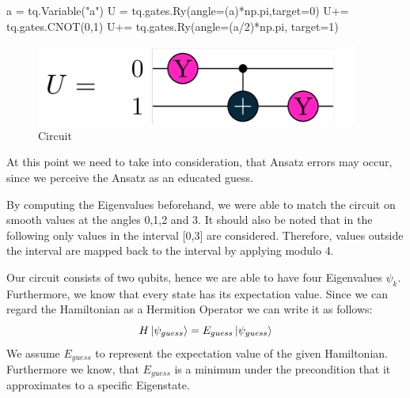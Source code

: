 \documentclass[
  letterpaper,
  DIV=11,
  numbers=noendperiod]{scrartcl}
\newenvironment{Shaded}{\begin{snugshade}}{\end{snugshade}}
\newcommand{\DecValTok}[1]{\textcolor[rgb]{0.68,0.00,0.00}{#1}}
\newcommand{\NormalTok}[1]{\textcolor[rgb]{0.00,0.23,0.31}{#1}}
\newcommand{\OperatorTok}[1]{\textcolor[rgb]{0.37,0.37,0.37}{#1}}
\newcommand{\StringTok}[1]{\textcolor[rgb]{0.13,0.47,0.30}{#1}}
\begin{document}
\begin{Shaded}
\begin{Highlighting}[]
\NormalTok{a }\OperatorTok{=}\NormalTok{ tq.Variable(}\StringTok{"a"}\NormalTok{)}
\NormalTok{U }\OperatorTok{=}\NormalTok{ tq.gates.Ry(angle}\OperatorTok{=}\NormalTok{(a)}\OperatorTok{*}\NormalTok{np.pi,target}\OperatorTok{=}\DecValTok{0}\NormalTok{)}
\NormalTok{U}\OperatorTok{+=}\NormalTok{ tq.gates.CNOT(}\DecValTok{0}\NormalTok{,}\DecValTok{1}\NormalTok{)}
\NormalTok{U}\OperatorTok{+=}\NormalTok{ tq.gates.Ry(angle}\OperatorTok{=}\NormalTok{(a}\OperatorTok{/}\DecValTok{2}\NormalTok{)}\OperatorTok{*}\NormalTok{np.pi, target}\OperatorTok{=}\DecValTok{1}\NormalTok{)}
\end{Highlighting}
\end{Shaded}

\begin{figure}[H]

{\centering \includegraphics[width=4.16667in,height=\textheight]{circuit.png}

}

\caption{Circuit}

\end{figure}%

At this point we need to take into consideration, that Ansatz errors may
occur, since we perceive the Ansatz as an educated guess.

By computing the Eigenvalues beforehand, we were able to match the
circuit on smooth values \hspace{0pt}\hspace{0pt}at the angles 0,1,2 and
3. It should also be noted that in the following only values
\hspace{0pt}\hspace{0pt}in the interval {[}0,3{]} are considered.
Therefore, values \hspace{0pt}\hspace{0pt}outside the interval are
mapped back to the interval by applying modulo 4.

Our circuit consists of two qubits, hence we are able to have four
Eigenvalues \(\psi_{k}\). Furthermore, we know that every state has its
expectation value. Since we can regard the Hamiltonian as a Hermition
Operator we can write it as follows:\\
\[H\ket{\psi_{guess}} =  E_{guess}\ket{\psi_{guess}}\] We assume
\(E_{guess}\) to represent the expectation value of the given
Hamiltonian. Furthermore we know, that \(E_{guess}\) is a minimum under
the precondition that it approximates to a specific Eigenstate.
\end{document}
